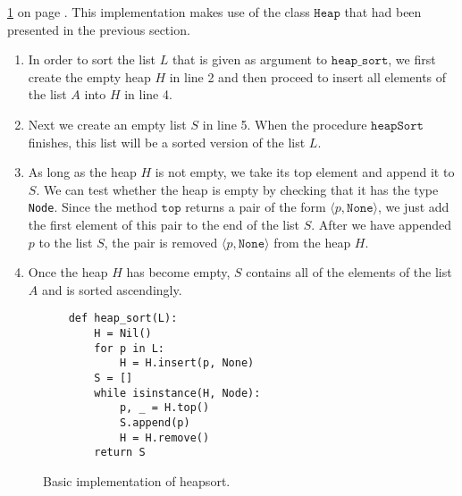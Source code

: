 \ref{fig:Heap.ipynb:heap_sort} on page \pageref{fig:Heap.ipynb:heap_sort}.  This implementation makes 
use of the class $\texttt{Heap}$ that had been presented in the previous section.
\begin{enumerate}
\item In order to sort the list $L$ that is given as argument to $\texttt{heap\_sort}$, we first
      create the empty heap $H$ in line 2 and then proceed to insert all elements of the list
      $A$ into $H$ in line 4.  
\item Next we create an empty list $S$ in line 5. When the procedure $\texttt{heapSort}$
      finishes, this list will be a sorted version of the list $L$.
\item As long as the heap $H$ is not empty, we take its top element and append it to
      $S$.  We can test whether the heap is empty by checking that it has the type \texttt{Node}.
      Since the method $\texttt{top}$ returns a pair of the form $\langle p, \texttt{None}\rangle$,
      we just add the first element of this pair to the
      end of the list $S$.  After we have appended $p$ to the list $S$, the pair
      is removed $\langle p, \texttt{None}\rangle$ from the heap ${H}$.
\item Once the heap ${H}$ has become empty, ${S}$ contains all of the elements of the list ${A}$
      and is sorted ascendingly.
\end{enumerate}

\begin{figure}[!ht]
\centering
\begin{verbatim}
    def heap_sort(L):
        H = Nil()
        for p in L:
            H = H.insert(p, None)
        S = []
        while isinstance(H, Node):
            p, _ = H.top()
            S.append(p)
            H = H.remove()
        return S
\end{verbatim}
\vspace*{-0.3cm}
\caption{Basic implementation of heapsort.}
\label{fig:Heap.ipynb:heap_sort}
\end{figure}


